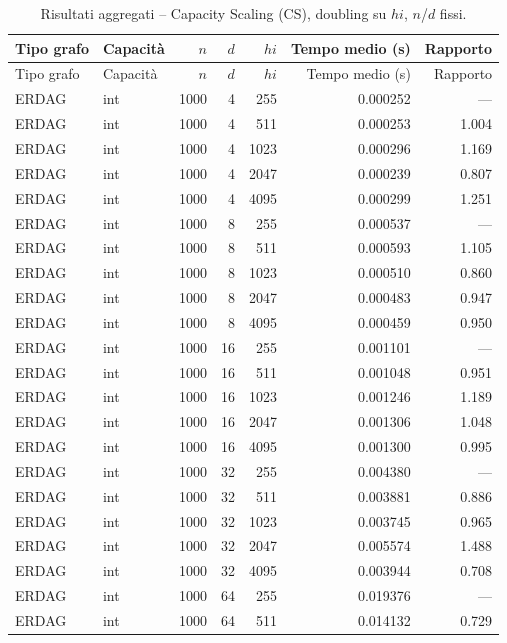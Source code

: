 \begin{longtable}{l l r r r r r}
\caption{Risultati aggregati -- Capacity Scaling (CS), doubling su $hi$, $n$/$d$ fissi.}
\label{tab:cs_doubling_hi} \\
\toprule
Tipo grafo & Capacit\`a & $n$ & $d$ & $hi$ & Tempo medio (s) & Rapporto \\
\midrule
\endfirsthead
\toprule
Tipo grafo & Capacit\`a & $n$ & $d$ & $hi$ & Tempo medio (s) & Rapporto \\
\midrule
\endhead
\bottomrule
\endfoot
ERDAG & int & 1000 & 4 & 255 & 0.000252 & --- \\
ERDAG & int & 1000 & 4 & 511 & 0.000253 & 1.004 \\
ERDAG & int & 1000 & 4 & 1023 & 0.000296 & 1.169 \\
ERDAG & int & 1000 & 4 & 2047 & 0.000239 & 0.807 \\
ERDAG & int & 1000 & 4 & 4095 & 0.000299 & 1.251 \\
\addlinespace
ERDAG & int & 1000 & 8 & 255 & 0.000537 & --- \\
ERDAG & int & 1000 & 8 & 511 & 0.000593 & 1.105 \\
ERDAG & int & 1000 & 8 & 1023 & 0.000510 & 0.860 \\
ERDAG & int & 1000 & 8 & 2047 & 0.000483 & 0.947 \\
ERDAG & int & 1000 & 8 & 4095 & 0.000459 & 0.950 \\
\addlinespace
ERDAG & int & 1000 & 16 & 255 & 0.001101 & --- \\
ERDAG & int & 1000 & 16 & 511 & 0.001048 & 0.951 \\
ERDAG & int & 1000 & 16 & 1023 & 0.001246 & 1.189 \\
ERDAG & int & 1000 & 16 & 2047 & 0.001306 & 1.048 \\
ERDAG & int & 1000 & 16 & 4095 & 0.001300 & 0.995 \\
\addlinespace
ERDAG & int & 1000 & 32 & 255 & 0.004380 & --- \\
ERDAG & int & 1000 & 32 & 511 & 0.003881 & 0.886 \\
ERDAG & int & 1000 & 32 & 1023 & 0.003745 & 0.965 \\
ERDAG & int & 1000 & 32 & 2047 & 0.005574 & 1.488 \\
ERDAG & int & 1000 & 32 & 4095 & 0.003944 & 0.708 \\
\addlinespace
ERDAG & int & 1000 & 64 & 255 & 0.019376 & --- \\
ERDAG & int & 1000 & 64 & 511 & 0.014132 & 0.729 \\

\end{longtable}
